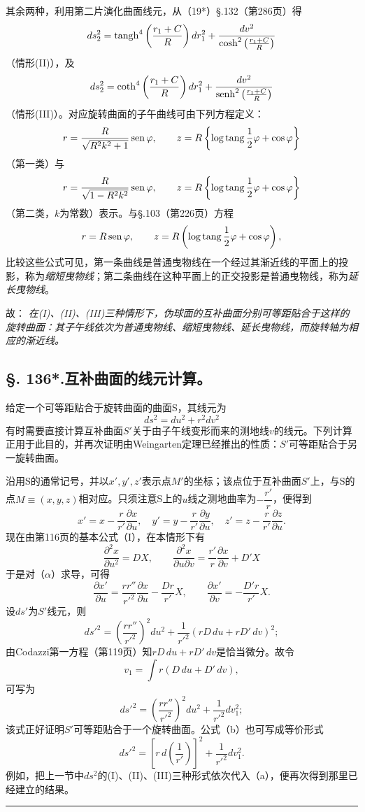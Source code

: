 其余两种，利用第二片演化曲面线元，从（19*）\S.132（第286页）得
\[
 ds_2^2=\operatorname{tangh}^4\left(\frac{r_1+C}{R}\right)dr_1^2+\frac{dv^2}{\cosh^2\left(\frac{r_1+C}{R}\right)}
\]
（情形(II)），及
\[
 ds_2^2=\operatorname{coth}^4\left(\frac{r_1+C}{R}\right)dr_1^2+\frac{dv^2}{\operatorname{senh}^2\left(\frac{r_1+C}{R}\right)}
\]
（情形(III)）。对应旋转曲面的子午曲线可由下列方程定义：
\[
 r=\frac{R}{\sqrt{R^2k^2+1}}\operatorname{sen}\varphi,
 \qquad
 z=R\left\{\log\operatorname{tang}\frac12\varphi+\cos\varphi\right\}
\]
（第一类）与
\[
 r=\frac{R}{\sqrt{1-R^2k^2}}\operatorname{sen}\varphi,
 \qquad
 z=R\left\{\log\operatorname{tang}\frac12\varphi+\cos\varphi\right\}
\]
（第二类，\(k\)为常数）表示。与\S.103（第226页）方程
\[
 r=R\operatorname{sen}\varphi,
 \qquad
 z=R\left(\log\operatorname{tang}\frac12\varphi+\cos\varphi\right),
\]
比较这些公式可见，第一条曲线是普通曳物线在一个经过其渐近线的平面上的投影，称为\emph{缩短曳物线}；第二条曲线在这种平面上的正交投影是普通曳物线，称为\emph{延长曳物线}。

故：
\emph{在(I)、(II)、(III)三种情形下，伪球面的互补曲面分别可等距贴合于这样的旋转曲面：其子午线依次为普通曳物线、缩短曳物线、延长曳物线，而旋转轴为相应的渐近线。}

\subsection*{\S. 136*.\quad 互补曲面的线元计算。}

给定一个可等距贴合于旋转曲面的曲面S，其线元为
\begin{equation}\tag{a}
 ds^2=du^2+r^2dv^2
\end{equation}
有时需要直接计算互补曲面\(S'\)关于由子午线变形而来的测地线\(v\)的线元。下列计算正用于此目的，并再次证明由Weingarten定理已经推出的性质：\(S'\)可等距贴合于另一旋转曲面。

沿用S的通常记号，并以\(x',y',z'\)表示点\(M'\)的坐标；该点位于互补曲面\(S'\)上，与S的点\(M\equiv(x,y,z)\)相对应。只须注意S上的\(u\)线之测地曲率为\(-\dfrac{r'}{r}\)，便得到
\begin{equation}\tag{$\alpha$}
 x'=x-\frac r{r'}\frac{\partial x}{\partial u},
 \quad
 y'=y-\frac r{r'}\frac{\partial y}{\partial u},
 \quad
 z'=z-\frac r{r'}\frac{\partial z}{\partial u}.
\end{equation}
现在由第116页的基本公式（I），在本情形下有
\[
 \frac{\partial^2x}{\partial u^2}=DX,
 \qquad
 \frac{\partial^2x}{\partial u\partial v}=\frac{r'}r\frac{\partial x}{\partial v}+D'X
\]
于是对（\(\alpha\)）求导，可得
\[
 \frac{\partial x'}{\partial u}=\frac{rr''}{r'^2}\frac{\partial x}{\partial u}-\frac{Dr}{r'}X,
 \qquad
 \frac{\partial x'}{\partial v}=-\frac{D'r}{r'}X.
\]
设\(ds'\)为\(S'\)线元，则
\[
 ds'^2=\left(\frac{rr''}{r'^2}\right)^2du^2+\frac1{r'^2}(rD\,du+rD'\,dv)^2;
\]
由Codazzi第一方程（第119页）知\(rD\,du+rD'\,dv\)是恰当微分。故令
\[
 v_1=\int r(D\,du+D'\,dv),
\]
可写为
\begin{equation}\tag{b}
 ds'^2=\left(\frac{rr''}{r'^2}\right)^2du^2+\frac1{r'^2}dv_1^2;
\end{equation}
该式正好证明\(S'\)可等距贴合于一个旋转曲面。公式（b）也可写成等价形式
\begin{equation}\tag{b*}
 ds'^2=\left[r\,d\left(\frac1{r'}\right)\right]^2+\frac1{r'^2}dv_1^2.
\end{equation}
例如，把上一节中\(ds^2\)的(I)、(II)、(III)三种形式依次代入（a），便再次得到那里已经建立的结果。

\begin{center}\rule{4em}{0.4pt}\end{center}



